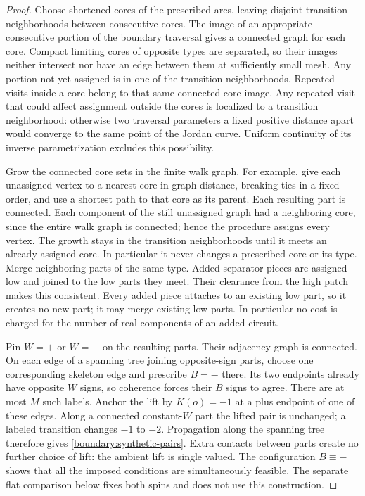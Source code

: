 \documentclass[11pt]{article}
\theoremstyle{definition}
\theoremstyle{remark}
\numberwithin{equation}{section}
\begin{document}
\begin{proof}
Choose shortened cores of the prescribed arcs, leaving disjoint
transition neighborhoods between consecutive cores.  The image of an
appropriate consecutive portion of the boundary traversal gives a
connected graph for each core.  Compact limiting cores of opposite
types are separated, so their images neither intersect nor have an
edge between them at sufficiently small mesh.  Any portion not yet
assigned is in one of the transition neighborhoods.  Repeated visits
inside a core belong to that same connected core image.  Any repeated
visit that could affect assignment outside the cores is localized to
a transition neighborhood: otherwise two traversal parameters a fixed
positive distance apart would converge to the same point of the Jordan
curve.  Uniform continuity of its inverse parametrization excludes
this possibility.

Grow the connected core sets in the finite walk graph.  For example,
give each unassigned vertex to a nearest core in graph distance,
breaking ties in a fixed order, and use a shortest path to that core
as its parent.  Each resulting part is connected.  Each component of
the still unassigned graph had a neighboring core, since the entire
walk graph is connected; hence the procedure assigns every vertex.
The growth stays in the transition neighborhoods until it meets an
already assigned core.  In particular it never changes a prescribed
core or its type.  Merge neighboring parts of the same type.  Added
separator pieces are assigned low and joined to the low parts they
meet.  Their clearance from the high patch makes this consistent.
Every added piece attaches to an existing low part, so it creates no
new part; it may merge existing low parts.  In particular no cost is
charged for the number of real components of an added circuit.

Pin $W=+$ or $W=-$ on the resulting parts.  Their adjacency graph is
connected.  On each edge of a spanning tree joining opposite-sign
parts, choose one corresponding skeleton edge and prescribe $B=-$
there.  Its two endpoints already have opposite $W$ signs, so
coherence forces their $B$ signs to agree.  There are at most $M$
such labels.  Anchor the lift by $K(o)=-1$ at a plus endpoint of one
of these edges.  Along a connected constant-$W$ part the lifted pair
is unchanged; a labeled transition changes $-1$ to $-2$.  Propagation
along the spanning tree therefore gives
\eqref{boundary:synthetic-pairs}.  Extra contacts between parts create
no further choice of lift: the ambient lift is single valued.  The
configuration $B\equiv-$ shows that all the imposed conditions are
simultaneously feasible.  The separate flat comparison below fixes
both spins and does not use this construction.


\end{proof}
\end{document}

